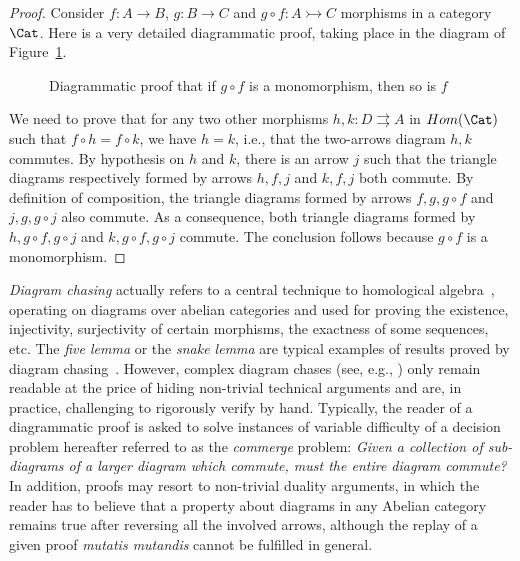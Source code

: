 \begin{proof}
  Consider $f : A \rightarrow B$, $g : B \rightarrow C$ and $g \circ f : A \rightarrowtail C$ morphisms in a category $\Cat$. Here is a very detailed diagrammatic proof, taking place in the diagram of Figure~\ref{fig:monomonom}.

  \begin{figure}[h!]
    \begin{center}
    \end{center}
    \caption{Diagrammatic proof that if $g \circ f$ is a monomorphism, then so is $f$}\label{fig:monomonom}
  \end{figure}

  We need to prove that for any two other morphisms $h,k : D \rightrightarrows A$ in $Hom(\Cat)$ such that $f \circ h = f \circ k$, we have $h = k$, i.e., that the two-arrows diagram $h, k$ commutes. By hypothesis on $h$ and $k$, there is an arrow $j$ such that the triangle diagrams respectively formed by arrows $h,f, j$ and $k, f, j$ both commute. By definition of composition, the triangle diagrams formed by arrows $f, g, g \circ f$ and $j, g, g \circ j$ also commute. As a consequence, both triangle diagrams formed by $h, g \circ f, g \circ j$ and $k, g \circ f, g \circ j$ commute. The conclusion follows because $g \circ f$ is a monomorphism.
\end{proof}

\emph{Diagram chasing} actually refers to a central technique to homological algebra~\cite{zbMATH00758278,zbMATH01324388}, operating on diagrams over abelian categories and used for proving the existence, injectivity, surjectivity of certain morphisms, the exactness of some sequences, etc. The \emph{five lemma} or the \emph{snake lemma} are typical examples of results proved by diagram chasing~\cite{zbMATH00758278}. However, complex diagram chases (see, e.g., \cite[p.338]{piquerez:tel-03499730}) only remain readable at the price of hiding non-trivial technical arguments and are, in practice, challenging to rigorously verify by hand. Typically, the reader of a diagrammatic proof is asked to solve instances of variable difficulty of a decision problem hereafter referred to as the \emph{commerge} problem: \emph{Given a collection of sub-diagrams of a larger diagram which commute, must the entire diagram commute?} In addition, proofs may resort to non-trivial duality arguments, in which the reader has to believe that a property about diagrams in any Abelian category remains true after reversing all the involved arrows, although the replay of a given proof \emph{mutatis mutandis} cannot be fulfilled in general.

